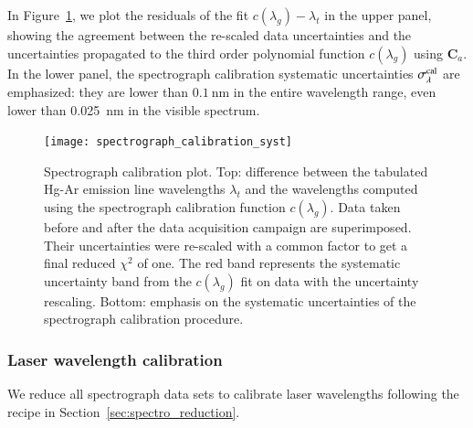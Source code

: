 In Figure~\ref{fig:spectro_calib_syst}, we plot the residuals of the fit $c(\lambda_g)-\lambda_t$ in the upper panel, showing the agreement between the re-scaled data uncertainties and the uncertainties propagated to the third order polynomial function $c(\lambda_g)$ using $\mathbf{C}_a$. In the lower panel, the spectrograph calibration systematic uncertainties $\sigma_\lambda^{\rm cal}$ are emphasized: they are lower than $\SI{0.1}{\nm}$ in the entire wavelength range, even lower than \SI{0.025}{\nm} in the visible spectrum.


\begin{figure}[!h]
\centering
\texttt{[image: spectrograph\_calibration\_syst]}
\caption{Spectrograph calibration plot. Top: difference between the tabulated Hg-Ar emission line wavelengths $\lambda_t$ and the wavelengths computed using the spectrograph calibration function $c(\lambda_g)$. Data taken before and after the data acquisition campaign are superimposed. Their uncertainties were re-scaled with a common factor to get a final reduced $\chi^2$ of one. The red band represents the systematic uncertainty band from the $c(\lambda_g)$ fit on data with the uncertainty rescaling. Bottom: emphasis on the systematic uncertainties of the spectrograph calibration procedure.}\label{fig:spectro_calib_syst}
\end{figure}


\subsubsection{Laser wavelength calibration}


We reduce all spectrograph data sets to calibrate laser wavelengths following the recipe in Section~\ref{sec:spectro_reduction}.


